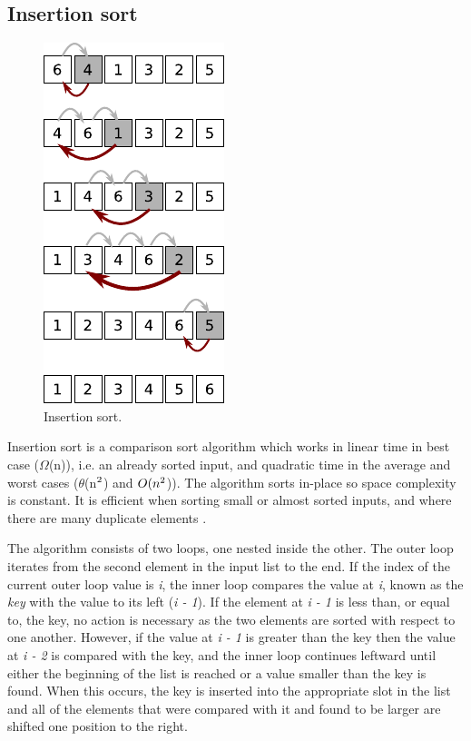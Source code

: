 \documentclass[12pt, a4paper]{article}
\begin{document}

\subsection{Insertion sort}


\begin{figure}
    \centering
    \includegraphics{insertion_sort.pdf}
    \caption{\label{fig:insertion_sort}Insertion sort.}
\end{figure}

Insertion sort is a comparison sort algorithm which works in linear time in best case ($\Omega$(n)), i.e. an already sorted input, and quadratic time in the average and worst cases ($\theta$(n$\textsuperscript{2}$) and $O(n\textsuperscript{2}$)). The algorithm sorts in-place so space complexity is constant. It is efficient when sorting small or almost sorted inputs, and where there are many duplicate elements \autocite[p. 60]{heineman2016algorithms}.

The algorithm consists of two loops, one nested inside the other. The outer loop iterates from the second element in the input list to the end. If the index of the current outer loop value is \emph{i}, the inner loop compares the value at \emph{i}, known as the \emph{key} with the value to its left (\emph{i - 1}). If the element at \emph{i - 1} is less than, or equal to, the key, no action is necessary as the two elements are sorted with respect to one another. However, if the value at \emph{i - 1} is greater than the key then the value at \emph{i - 2} is compared with the key, and the inner loop continues leftward until either the beginning of the list is reached or a value smaller than the key is found. When this occurs, the key is inserted into the appropriate slot in the list and all of the elements that were compared with it and found to be larger are shifted one position to the right.
\end{document}
